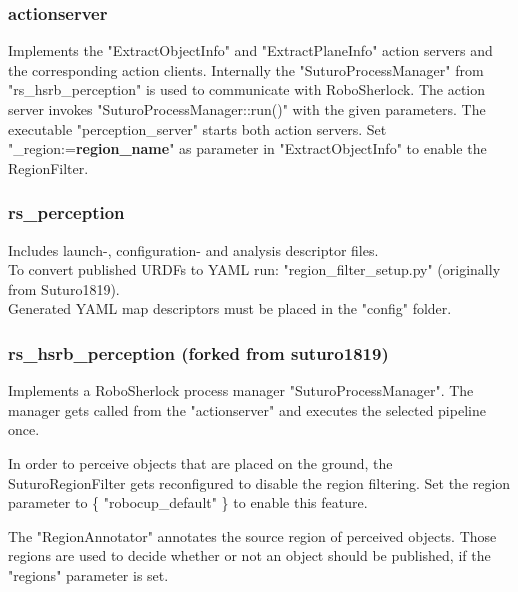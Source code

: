 \documentclass[main.tex]{subfiles}
\begin{document}
			\subsubsection{actionserver}
			Implements the "ExtractObjectInfo" and "ExtractPlaneInfo" action servers and the corresponding action clients.
			Internally the "SuturoProcessManager" from "rs\_hsrb\_perception" is used to communicate with RoboSherlock.
			The action server invokes "SuturoProcessManager::run()" with the given parameters. 
			The executable "perception\_server" starts both action servers.
			Set "\_region:=\textbf{region\_name}" as parameter in "ExtractObjectInfo" to enable the RegionFilter.

			\subsubsection{rs\_perception}
			Includes launch-, configuration- and analysis descriptor files.\\
			To convert published URDFs to YAML run: "region\_filter\_setup.py" (originally from Suturo1819).\\
			Generated YAML map descriptors must be placed in the "config" folder.

			\subsubsection{rs\_hsrb\_perception (forked from suturo1819)}
			Implements a RoboSherlock process manager "SuturoProcessManager".
			The manager gets called from the "actionserver" and executes the selected pipeline once.
			
			In order to perceive objects that are placed on the ground, the SuturoRegionFilter gets reconfigured
			to disable the region filtering. Set the region parameter to \{ "robocup\_default" \} to enable this feature.

			The "RegionAnnotator" annotates the source region of perceived objects. Those regions are used
			to decide whether or not an object should be published, if the "regions" parameter is set.
\end{document}
